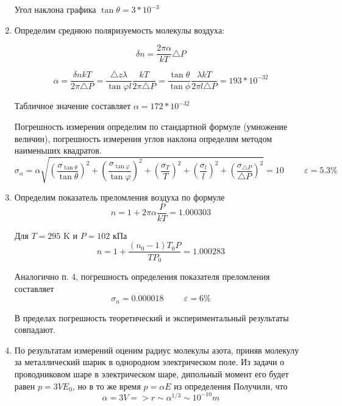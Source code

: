 \documentclass[a4paper]{article}
\begin{document}
\begin{enumerate}
Угол наклона графика $\tan \theta = 3*10^{-3}$

\item Определим среднюю поляризуемость молекулы воздуха:

\begin{equation}
\delta n = \frac{2 \pi \alpha}{kT} \triangle P
\end{equation}

\begin{equation}
\alpha = \frac{\delta n kT}{2 \pi \triangle P} = \frac{\triangle z \lambda}{\tan \varphi l} \frac{kT}{2 \pi \triangle P} =\frac{\tan \theta}{\tan \phi} \frac{\lambda kT}{2 \pi l \triangle P} = 193*10^{-32}
\end{equation}

Табличное значение составляет $\alpha = 172 * 10^{-32}$

Погрешность измерения определим по стандартной формуле (умножение величин), погрешность измерения углов наклона определим методом наименьших квадратов.
\begin{equation}
\sigma_{\alpha} = \alpha\sqrt{(\frac{\sigma_{\tan \theta}}{\tan \theta})^2 + (\frac{\sigma_{\tan \varphi}}{\tan \varphi})^2 + (\frac{\sigma_{T}}{T})^2 + (\frac{\sigma_{l}}{l})^2 + (\frac{\sigma_{\triangle P}}{\triangle P})^2} = 10 \hspace{1cm} \varepsilon = 5.3\%
\end{equation}

\item Определим показатель преломления воздуха по формуле
\begin{equation}
    n = 1 + 2\pi\alpha \frac{P}{kT} = 1.000303
\end{equation}

Для $T = 295$ K и $P = 102$ кПа
\begin{equation}
    n = 1 + \frac{(n_0 - 1)T_0 P}{T P_0} = 1.000283
\end{equation}

Аналогично п. 4, погрешность определения показателя преломления составляет 
\begin{equation}
    \sigma_n = 0.000018 \hspace{1cm} \varepsilon = 6 \%
\end{equation}

В пределах погрешность теоретический и экспериментальный результаты совпадают.

\item По результатам измерений оценим радиус молекулы азота, приняв молекулу за металлический шарик в однородном электрическом поле. Из задачи о проводниковом шаре в электрическом шаре, дипольный момент его будет равен $p = 3V E_0$, но в то же время $p = \alpha E$ из определения
Получили, что 
\begin{equation}
    \alpha = 3 V => r \sim \alpha^{1/3} \sim 10^{-10} m
\end{equation}


\end{enumerate}
\end{document}
